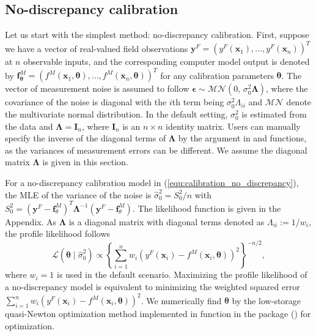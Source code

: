 \subsection{No-discrepancy calibration}
{Let us start with the simplest method: no-discrepancy calibration}. First, suppose we have a vector of real-valued field observations $\mathbf y^F=(y^F(\mathbf x_1),...,y^F(\mathbf x_n))^T$ at $n$ observable inputs, and the corresponding computer model output is denoted by $\mathbf f^M_{\bm \theta}=(f^M(\mathbf x_1,\bm \theta),...,f^M(\mathbf x_n,\bm \theta))^T$ for any calibration parameters $\bm \theta$. The vector of measurement noise is assumed to follow $\bm \epsilon \sim \mathcal{MN}(0,\, \sigma^2_0 \bm \Lambda)$, where the covariance of the noise is diagonal with the $i$th term being $\sigma^2_0\Lambda_{ii}$ and $ \mathcal{MN}$ denote the multivariate normal distribution. %
 In the default setting, $\sigma^2_0$ is estimated from the data and $ \bm \Lambda=\mathbf I_n$, where $\mathbf I_n$ is an $n\times n$ identity matrix. Users can manually specify the inverse of the diagonal terms of $\bm \Lambda$ by the  argument in  and  functions, as the variances of measurement errors can be different. We assume the diagonal matrix $\bm \Lambda$ is given in this section. 


  For a no-discrepancy calibration model in (\ref{equ:calibration_no_discrepancy}),  the MLE of the variance of the noise is $\hat \sigma^2_0=S^2_0/n$ with $S^2_0=(\mathbf y^F-\mathbf f^M_{\theta} )^T \bm \Lambda^{-1}(\mathbf y^F-\mathbf f^M_{\theta} )$.  The likelihood function is given in the Appendix. As $\bm \Lambda$ is a diagonal matrix with diagonal terms denoted as $\Lambda_{ii}:=1/w_i$, the profile likelihood  follows
\[ \mathcal L( \bm \theta\mid  \hat \sigma^2_0 ) \propto  \left\{ \sum^n_{i=1} w_i \left(y^F(\mathbf x_i)- f^M(\mathbf x_i, \bm \theta)\right)^2\right\}^{-n/2}, \]
where $w_i=1$ is used in the default scenario.   Maximizing the profile likelihood of a no-discrepancy model is equivalent to minimizing the weighted squared error  $\sum^n_{i=1} w_i \left(y^F(\mathbf x_i)- f^M(\mathbf x_i, \bm \theta)\right)^2$. We numerically find $\bm \theta$ by the low-storage quasi-Newton optimization method \citep{liu1989limited} implemented in  function in the  package (\cite{nloptr2014}) for optimization. 
  
